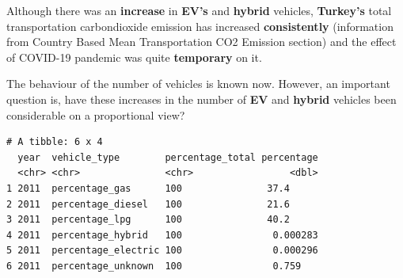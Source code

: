 \documentclass[
  11pt,
  a4paper,
  DIV=11,
  numbers=noendperiod]{scrartcl}
\newenvironment{Shaded}{\begin{snugshade}}{\end{snugshade}}
\newcommand{\AttributeTok}[1]{\textcolor[rgb]{0.40,0.45,0.13}{#1}}
\newcommand{\FunctionTok}[1]{\textcolor[rgb]{0.28,0.35,0.67}{#1}}
\newcommand{\NormalTok}[1]{\textcolor[rgb]{0.00,0.23,0.31}{#1}}
\newcommand{\OtherTok}[1]{\textcolor[rgb]{0.00,0.23,0.31}{#1}}
\newcommand{\SpecialCharTok}[1]{\textcolor[rgb]{0.37,0.37,0.37}{#1}}
\newcommand{\StringTok}[1]{\textcolor[rgb]{0.13,0.47,0.30}{#1}}
\begin{document}
Although there was an \textbf{increase} in \textbf{EV's} and
\textbf{hybrid} vehicles, \textbf{Turkey's} total transportation
carbondioxide emission has increased \textbf{consistently} (information
from Country Based Mean Transportation CO2 Emission section) and the
effect of COVID-19 pandemic was quite \textbf{temporary} on it.

The behaviour of the number of vehicles is known now. However, an
important question is, have these increases in the number of \textbf{EV}
and \textbf{hybrid} vehicles been considerable on a proportional view?

\begin{Shaded}
\end{Shaded}

\begin{verbatim}
# A tibble: 6 x 4
  year  vehicle_type        percentage_total percentage
  <chr> <chr>               <chr>                 <dbl>
1 2011  percentage_gas      100               37.4     
2 2011  percentage_diesel   100               21.6     
3 2011  percentage_lpg      100               40.2     
4 2011  percentage_hybrid   100                0.000283
5 2011  percentage_electric 100                0.000296
6 2011  percentage_unknown  100                0.759   
\end{verbatim}
\end{document}
